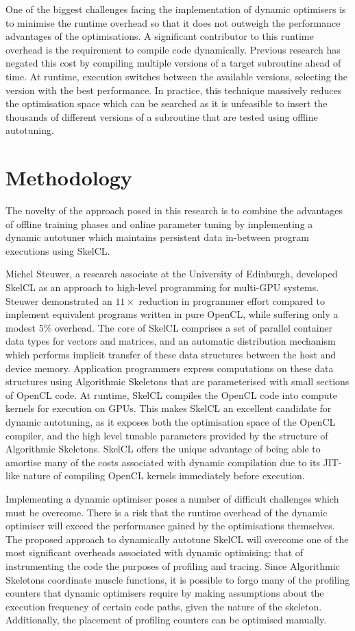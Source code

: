 One of the biggest challenges facing the implementation of dynamic
optimisers is to minimise the runtime overhead so that it does not
outweigh the performance advantages of the optimisations. A
significant contributor to this runtime overhead is the requirement to
compile code dynamically. Previous research has negated this cost by
compiling multiple versions of a target subroutine ahead of time. At
runtime, execution switches between the available versions, selecting
the version with the best performance. In practice, this technique
massively reduces the optimisation space which can be searched as it
is unfeasible to insert the thousands of different versions of a
subroutine that are tested using offline autotuning.

\section{Methodology}

The novelty of the approach posed in this research is to combine the
advantages of offline training phases and online parameter tuning by
implementing a dynamic autotuner which maintains persistent data
in-between program executions using SkelCL.

Michel Steuwer, a research associate at the University of Edinburgh,
developed SkelCL as an approach to high-level programming for
multi-GPU systems. Steuwer demonstrated an $11\times$ reduction in
programmer effort compared to implement equivalent programs written in
pure OpenCL, while suffering only a modest 5\% overhead. The core of
SkelCL comprises a set of parallel container data types for vectors
and matrices, and an automatic distribution mechanism which performs
implicit transfer of these data structures between the host and device
memory. Application programmers express computations on these data
structures using Algorithmic Skeletons that are parameterised with
small sections of OpenCL code. At runtime, SkelCL compiles the OpenCL
code into compute kernels for execution on GPUs. This makes SkelCL an
excellent candidate for dynamic autotuning, as it exposes both the
optimisation space of the OpenCL compiler, and the high level tunable
parameters provided by the structure of Algorithmic Skeletons. SkelCL
offers the unique advantage of being able to amortise many of the
costs associated with dynamic compilation due to its JIT-like nature
of compiling OpenCL kernels immediately before execution.

Implementing a dynamic optimiser poses a number of difficult
challenges which must be overcome.
There is a risk that the runtime overhead of the dynamic optimiser
will exceed the performance gained by the optimisations
themselves. The proposed approach to dynamically autotune SkelCL will
overcome one of the most significant overheads associated with dynamic
optimising: that of instrumenting the code the purposes of profiling
and tracing. Since Algorithmic Skeletons coordinate muscle functions,
it is possible to forgo many of the profiling counters that dynamic
optimisers require by making assumptions about the execution frequency
of certain code paths, given the nature of the skeleton. Additionally,
the placement of profiling counters can be optimised manually.

